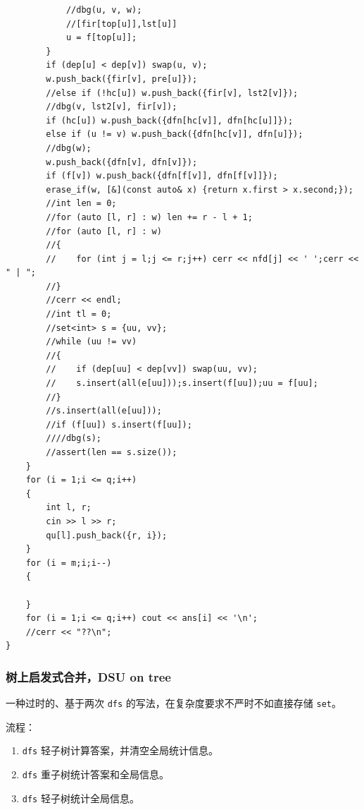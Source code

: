 \documentclass[12pt]{ctexart}
\begin{document}
\begin{lstlisting}
            //dbg(u, v, w);
            //[fir[top[u]],lst[u]]
            u = f[top[u]];
        }
        if (dep[u] < dep[v]) swap(u, v);
        w.push_back({fir[v], pre[u]});
        //else if (!hc[u]) w.push_back({fir[v], lst2[v]});
        //dbg(v, lst2[v], fir[v]);
        if (hc[u]) w.push_back({dfn[hc[v]], dfn[hc[u]]});
        else if (u != v) w.push_back({dfn[hc[v]], dfn[u]});
        //dbg(w);
        w.push_back({dfn[v], dfn[v]});
        if (f[v]) w.push_back({dfn[f[v]], dfn[f[v]]});
        erase_if(w, [&](const auto& x) {return x.first > x.second;});
        //int len = 0;
        //for (auto [l, r] : w) len += r - l + 1;
        //for (auto [l, r] : w)
        //{
        //    for (int j = l;j <= r;j++) cerr << nfd[j] << ' ';cerr << " | ";
        //}
        //cerr << endl;
        //int tl = 0;
        //set<int> s = {uu, vv};
        //while (uu != vv)
        //{
        //    if (dep[uu] < dep[vv]) swap(uu, vv);
        //    s.insert(all(e[uu]));s.insert(f[uu]);uu = f[uu];
        //}
        //s.insert(all(e[uu]));
        //if (f[uu]) s.insert(f[uu]);
        ////dbg(s);
        //assert(len == s.size());
    }
    for (i = 1;i <= q;i++)
    {
        int l, r;
        cin >> l >> r;
        qu[l].push_back({r, i});
    }
    for (i = m;i;i--)
    {

    }
    for (i = 1;i <= q;i++) cout << ans[i] << '\n';
    //cerr << "??\n";
}

\end{lstlisting}


\subsubsection{树上启发式合并，DSU on tree}

一种过时的、基于两次 \verb|dfs| 的写法，在复杂度要求不严时不如直接存储 \verb|set|。

流程：

\begin{enumerate}
	\item \verb|dfs| 轻子树计算答案，并清空全局统计信息。
	\item \verb|dfs| 重子树统计答案和全局信息。
	\item \verb|dfs| 轻子树统计全局信息。
\end{enumerate}
\end{document}
